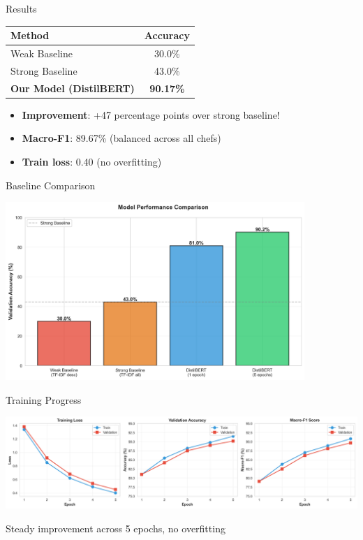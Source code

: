 \documentclass{beamer}
\begin{document}
\begin{frame}{Results}
\begin{table}
\centering
\begin{tabular}{lc}
\toprule
\textbf{Method} & \textbf{Accuracy} \\
\midrule
Weak Baseline & 30.0\% \\
Strong Baseline & 43.0\% \\
\textbf{Our Model (DistilBERT)} & \textbf{90.17\%} \\
\bottomrule
\end{tabular}
\end{table}

\vspace{0.5cm}

\begin{itemize}
    \item \textbf{Improvement}: +47 percentage points over strong baseline!
    \item \textbf{Macro-F1}: 89.67\% (balanced across all chefs)
    \item \textbf{Train loss}: 0.40 (no overfitting)
\end{itemize}
\end{frame}

\begin{frame}{Baseline Comparison}
\begin{center}
\includegraphics[width=0.85\textwidth]{../results/figures/baseline_comparison.png}
\end{center}
\end{frame}

\begin{frame}{Training Progress}
\begin{center}
\includegraphics[width=\textwidth]{../results/figures/training_curves.png}
\end{center}
Steady improvement across 5 epochs, no overfitting
\end{frame}
\end{document}
